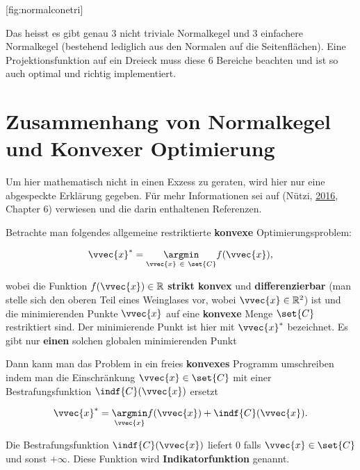 \documentclass[
  12pt,
  american,
  a4paper,
  twoside,
  titlepage,
  openright,
  numbers=noenddot,
  chapterprefix=true,
  headings=optiontohead,
  svgnames,
  dvipsnames]{scrreprt}
\begin{document}
[fig:normalconetri]

Das heisst es gibt genau 3 nicht triviale Normalkegel und 3 einfachere
Normalkegel (bestehend lediglich aus den Normalen auf die
Seitenflächen). Eine Projektionsfunktion auf ein Dreieck muss diese 6
Bereiche beachten und ist so auch optimal und richtig implementiert.

\hypertarget{zusammenhang-von-normalkegel-und-konvexer-optimierung}{%
\section{Zusammenhang von Normalkegel und Konvexer
Optimierung}\label{zusammenhang-von-normalkegel-und-konvexer-optimierung}}

Um hier mathematisch nicht in einen Exzess zu geraten, wird hier nur
eine abgespeckte Erklärung gegeben. Für mehr Informationen sei auf
(Nützi, \protect\hyperlink{ref-nuetzig_thesis_2016}{2016}, Chapter 6)
verwiesen und die darin enthaltenen Referenzen.

Betrachte man folgendes allgemeine restriktierte \textbf{konvexe}
Optimierungsproblem:

\begin{align}
\vvec{x}^* = \underset{\vvec{x} \ \in \ \set{C}}{\argmin} f(\vvec{x}),
\label{eq:convexproblem}
\end{align}

wobei die Funktion \(f(\vvec{x}) \in \mathbb{R}\) \textbf{strikt konvex}
und \textbf{differenzierbar} (man stelle sich den oberen Teil eines
Weinglases vor, wobei \(\vvec{x} \in \mathbb{R}^2\)) ist und die
minimierenden Punkte \(\vvec{x}\) auf eine \textbf{konvexe} Menge
\(\set{C}\) restriktiert sind. Der minimierende Punkt ist hier mit
\(\vvec{x}^*\) bezeichnet. Es gibt nur \textbf{einen} solchen globalen
minimierenden Punkt

Dann kann man das Problem in ein freies \textbf{konvexes} Programm
umschreiben indem man die Einschränkung \(\vvec{x} \in \set{C}\) mit
einer Bestrafungsfunktion \(\indf{C}(\vvec{x})\) ersetzt

\begin{align}
\vvec{x}^* = \underset{\vvec{x}}{\argmin} f(\vvec{x}) + \indf{C}(\vvec{x}).
\end{align}

Die Bestrafungsfunktion \(\indf{C}(\vvec{x})\) liefert \(0\) falls
\(\vvec{x} \in \set{C}\) und sonst \(+\infty\). Diese Funktion wird
\textbf{Indikatorfunktion} genannt.
\end{document}
